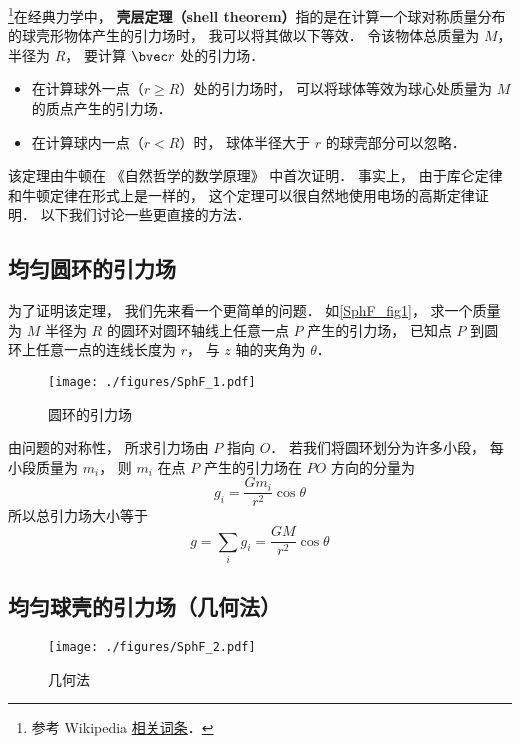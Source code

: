

\footnote{参考 Wikipedia \href{https://en.wikipedia.org/wiki/Shell_theorem}{相关词条}．}在经典力学中， \textbf{壳层定理（shell theorem）}指的是在计算一个球对称质量分布的球壳形物体产生的引力场时， 我可以将其做以下等效． 令该物体总质量为 $M$， 半径为 $R$， 要计算 $\bvec r$ 处的引力场．
\begin{itemize}
\item 在计算球外一点（$r \geqslant R$）处的引力场时， 可以将球体等效为球心处质量为 $M$ 的质点产生的引力场．
\item 在计算球内一点（$r < R$）时， 球体半径大于 $r$ 的球壳部分可以忽略．
\end{itemize}

该定理由牛顿在 《自然哲学的数学原理》 中首次证明． 事实上， 由于库仑定律和牛顿定律在形式上是一样的， 这个定理可以很自然地使用电场的高斯定律证明． 以下我们讨论一些更直接的方法．

\subsection{均匀圆环的引力场}
为了证明该定理， 我们先来看一个更简单的问题． 如\autoref{SphF_fig1}， 求一个质量为 $M$ 半径为 $R$ 的圆环对圆环轴线上任意一点 $P$ 产生的引力场， 已知点 $P$ 到圆环上任意一点的连线长度为 $r$， 与 $z$ 轴的夹角为 $\theta$．

\begin{figure}[ht]
\centering
\texttt{[image: ./figures/SphF\_1.pdf]}
\caption{圆环的引力场} \label{SphF_fig1}
\end{figure}

由问题的对称性， 所求引力场由 $P$ 指向 $O$． 若我们将圆环划分为许多小段， 每小段质量为 $m_i$， 则 $m_i$ 在点 $P$ 产生的引力场在 $PO$ 方向的分量为
\begin{equation}
g_i = \frac{Gm_i}{r^2}\cos\theta
\end{equation}
所以总引力场大小等于
\begin{equation}\label{SphF_eq2}
g = \sum_i g_i = \frac{GM}{r^2}\cos\theta
\end{equation}

\subsection{均匀球壳的引力场（几何法）}

\begin{figure}[ht]
\centering
\texttt{[image: ./figures/SphF\_2.pdf]}
\caption{几何法} \label{SphF_fig2}
\end{figure}


